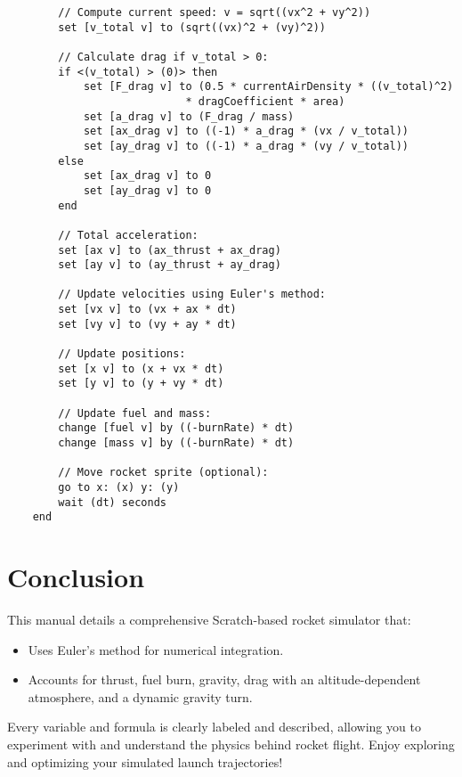 \documentclass[12pt]{article}
\begin{document}
\begin{verbatim}
        // Compute current speed: v = sqrt((vx^2 + vy^2))
        set [v_total v] to (sqrt((vx)^2 + (vy)^2))
        
        // Calculate drag if v_total > 0:
        if <(v_total) > (0)> then
            set [F_drag v] to (0.5 * currentAirDensity * ((v_total)^2)
            				* dragCoefficient * area)
            set [a_drag v] to (F_drag / mass)
            set [ax_drag v] to ((-1) * a_drag * (vx / v_total))
            set [ay_drag v] to ((-1) * a_drag * (vy / v_total))
        else
            set [ax_drag v] to 0
            set [ay_drag v] to 0
        end
        
        // Total acceleration:
        set [ax v] to (ax_thrust + ax_drag)
        set [ay v] to (ay_thrust + ay_drag)
        
        // Update velocities using Euler's method:
        set [vx v] to (vx + ax * dt)
        set [vy v] to (vy + ay * dt)
        
        // Update positions:
        set [x v] to (x + vx * dt)
        set [y v] to (y + vy * dt)
        
        // Update fuel and mass:
        change [fuel v] by ((-burnRate) * dt)
        change [mass v] by ((-burnRate) * dt)
        
        // Move rocket sprite (optional):
        go to x: (x) y: (y)
        wait (dt) seconds
    end
\end{verbatim}

\section{Conclusion}
This manual details a comprehensive Scratch-based rocket simulator that:
\begin{itemize}
    \item Uses Euler's method for numerical integration.
    \item Accounts for thrust, fuel burn, gravity, drag with an altitude-dependent atmosphere, and a dynamic gravity turn.
\end{itemize}
Every variable and formula is clearly labeled and described, allowing you to experiment with and understand the physics behind rocket flight. Enjoy exploring and optimizing your simulated launch trajectories!
\end{document}
